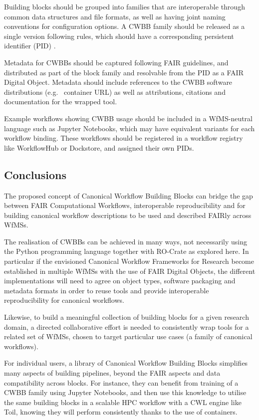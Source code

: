 Building blocks should be grouped into families that are interoperable
through common data structures and file formats, as well as having joint
naming conventions for configuration options. A CWBB family should be
released as a single version following
 rules,
which should have a corresponding persistent identifier (PID) \cite{McMurry 2017}.

Metadata for CWBBs should be captured following FAIR guidelines, and
distributed as part of the block family and resolvable from the PID as a
FAIR Digital Object. Metadata should include references to the CWBB
software distributions (e.g.~
container URL) as well as attributions, citations and documentation for
the wrapped tool.

Example workflows showing CWBB usage should be included in a
WfMS-neutral language such as Jupyter Notebooks, which may have
equivalent variants for each workflow binding. These workflows should be
registered in a workflow registry like WorkflowHub or Dockstore, and
assigned their own PIDs.

\subsection{Conclusions}\label{ch6:conclusions}

The proposed concept of Canonical Workflow Building Blocks can bridge
the gap between FAIR Computational Workflows, interoperable
reproducibility and for building canonical workflow descriptions to be
used and described FAIRly across WfMSs.

The realisation of CWBBs can be achieved in many ways, not necessarily
using the Python programming language together with RO-Crate as explored
here. In particular if the envisioned Canonical Workflow Frameworks for
Research become established in multiple WfMSs with the use of FAIR
Digital Objects, the different implementations will need to agree on
object types, software packaging and metadata formats in order to reuse
tools and provide interoperable reproducibility for canonical workflows.

Likewise, to build a meaningful collection of building blocks for a
given research domain, a directed collaborative effort is needed to
consistently wrap tools for a related set of WfMSs, chosen to target
particular use cases (a family of canonical workflows).

For individual users, a library of Canonical Workflow Building Blocks
simplifies many aspects of building pipelines, beyond the FAIR aspects
and data compatibility across blocks. For instance, they can benefit
from training of a CWBB family using Jupyter Notebooks, and then use
this knowledge to utilise the same building blocks in a scalable HPC
workflow with a CWL engine like Toil, knowing they will perform
consistently thanks to the use of containers.

